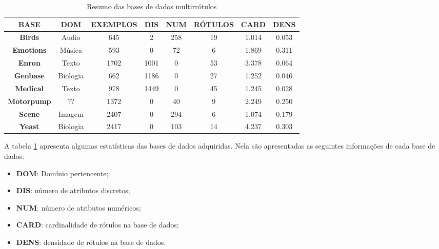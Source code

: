 \begin{table}[h]
\begin{tabular}{|c|ccccccc|}
\hline
\textbf{BASE}      & \textbf{DOM} & \textbf{EXEMPLOS} & \textbf{DIS} & \textbf{NUM} & \textbf{RÓTULOS} & \textbf{CARD} & \textbf{DENS} \\ \hline
\textbf{Birds}     & Audio            & 645               & 2                 & 258                & 19               & 1.014                  & 0.053              \\
\textbf{Emotions}  & Música           & 593               & 0                 & 72                 & 6                & 1.869                  & 0.311              \\
\textbf{Enron}     & Texto            & 1702              & 1001              & 0                  & 53               & 3.378                  & 0.064              \\
\textbf{Genbase}   & Biologia         & 662               & 1186              & 0                  & 27               & 1.252                  & 0.046              \\
\textbf{Medical}   & Texto            & 978               & 1449              & 0                  & 45               & 1.245                  & 0.028              \\
\textbf{Motorpump} & ??               & 1372              & 0                 & 40                 & 9                & 2.249                  & 0.250              \\
\textbf{Scene}     & Imagem           & 2407              & 0                 & 294                & 6                & 1.074                  & 0.179              \\
\textbf{Yeast}     & Biologia         & 2417              & 0                 & 103                & 14               & 4.237                  & 0.303              \\  \hline

\end{tabular}
\caption{Resumo das bases de dados multirrótulos}
\label{tab:datas}
\end{table}

A tabela \ref{tab:datas} apresenta algumas estatísticas das bases de dados adquiridas.
Nela são apresentadas as seguintes informações de cada base de dados:
\begin{itemize}
  \item \textbf{DOM}: Domínio pertencente;
  \item \textbf{DIS}: número de atributos discretos;
  \item \textbf{NUM}: número de atributos numéricos;
  \item \textbf{CARD}: cardinalidade de rótulos na base de dados;
  \item \textbf{DENS}: densidade de rótulos na base de dados.
\end{itemize}


